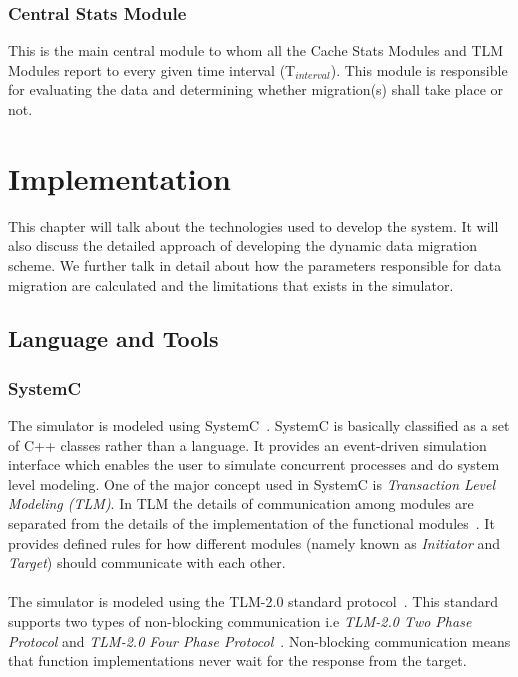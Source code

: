 \documentclass{listhesis}
\begin{document}
\subsection{Central Stats Module}
This is the main central module to whom all the Cache Stats Modules and TLM Modules report to every given time interval (T$_{interval}$). This module is responsible for evaluating the data and determining whether migration(s) shall take place or not.
\chapter{Implementation}
This chapter will talk about the technologies used to develop the system. It will also discuss the detailed approach of developing the dynamic data migration scheme. We further talk in detail about how the parameters responsible for data migration are calculated and the limitations that exists in the simulator. \\
\section{Language and Tools}
\subsection{SystemC}
The simulator is modeled using SystemC~\cite{systemc}. SystemC is basically classified as a set of C++ classes rather than a language. It provides an event-driven simulation interface which enables the user to simulate concurrent processes and do system level modeling. One of the major concept used in SystemC is \textit{Transaction Level Modeling (TLM)}. In TLM the details of communication among modules are separated from the details of the implementation of the functional modules~\cite{tlm}. It provides defined rules for how different modules (namely known as \textit{Initiator} and \textit{Target}) should communicate with each other. \\
\\
The simulator is modeled using the TLM-2.0 standard protocol~\cite{systemc}. This standard supports two types of non-blocking communication i.e \textit{TLM-2.0 Two Phase Protocol} and \textit{TLM-2.0 Four Phase Protocol}~\cite{akshay}. Non-blocking communication means that function implementations never wait for the response from the target.
\end{document}
